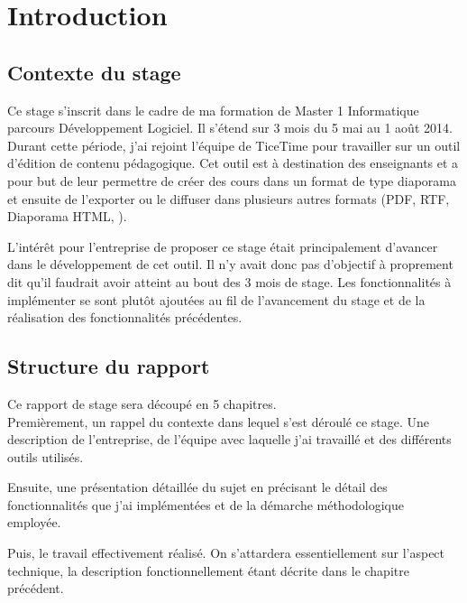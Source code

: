 \chapter*{Introduction}

\section*{Contexte du stage}
Ce stage s'inscrit dans le cadre de ma formation de Master 1 Informatique parcours
Développement Logiciel. Il s'étend sur 3 mois du 5 mai au 1\ier{} août 2014.\\

Durant cette période, j'ai rejoint l'équipe de TiceTime pour travailler sur un
outil d'édition de contenu pédagogique. Cet outil est à destination des
enseignants et a pour but de leur permettre de créer des cours dans un format de
type diaporama et ensuite de l'exporter ou le diffuser dans plusieurs autres formats
(PDF, RTF, Diaporama HTML, ).

L'intérêt pour l'entreprise de proposer ce stage était principalement d'avancer
dans le développement de cet outil. Il n'y avait donc pas d'objectif à
proprement dit qu'il faudrait avoir atteint au bout des 3 mois de stage. Les
fonctionnalités à implémenter se sont plutôt ajoutées au fil de l'avancement du
stage et de la réalisation des fonctionnalités précédentes.

\section*{Structure du rapport}

Ce rapport de stage sera découpé en 5 chapitres.\\

Premièrement, un rappel du contexte dans lequel s'est déroulé ce stage. Une
description de l'entreprise, de l'équipe avec laquelle j'ai travaillé et des
différents outils utilisés.

Ensuite, une présentation détaillée du sujet en précisant le détail des
fonctionnalités que j'ai implémentées et de la démarche méthodologique
employée.

Puis, le travail effectivement réalisé. On s'attardera essentiellement sur
l'aspect technique, la description fonctionnellement étant décrite dans le
chapitre précédent.

